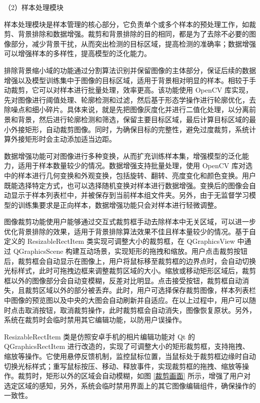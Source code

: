 \documentclass[
  ]{njuthesis}
\begin{document}
（2）样本处理模块

样本处理模块是样本管理的核心部分，它负责单个或多个样本的预处理工作，如裁剪、背景排除和数据增强。裁剪和背景排除的目的相同，都是为了去除不必要的图像部分，减少背景干扰，从而突出检测的目标区域，提高检测的准确率；数据增强可以增强样本的多样性，提高模型的泛化能力。

排除背景缩小域的功能通过分割算法识别并保留图像的主体部分，保证后续的数据增强以及模型训练集中于图像的目标区域，适用于背景相对明显的样本。相较于手动裁剪，它可以对样本进行批量处理，效率更高。该功能使用 OpenCV 库实现，先对图像进行阈值处理、轮廓检测和过滤，然后基于形态学操作进行轮廓优化，去除噪点和细小碎片。具体来说，就是先把图像灰度化并进行二值化处理，以分离前景和背景，然后进行轮廓检测和筛选，保留主要目标区域，最后计算目标区域的最小外接矩形，自动裁剪图像。同时，为确保目标的完整性，避免过度裁剪，系统计算外接矩形时会主动添加适当边距。

数据增强功能可对图像进行多种变换，从而扩充训练样本集，增强模型的泛化能力，适用于样本数量较少的情况。数据增强支持批量处理，使用 OpenCV 库对选中的样本进行几何变换和外观变换，包括旋转、翻转、亮度变化和颜色变换。用户既能选择特定方式，也可以选择随机变换对样本进行数据增强。变换后的图像会自动显示于样本列表栏中，并被保存到当前样本组文件夹。另外，由于无监督学习模型的训练集要求是正向样本，数据增强功能只会对样本进行轻微调整。

图像裁剪功能使用户能够通过交互式裁剪框手动去除样本中无关区域，可以进一步优化背景排除的效果，适用于背景排除算法效果不佳且样本量较少的情况。基于自定义的 ResizableRectItem 类实现可调整大小的裁剪框，在 QGraphicsView 中通过 QGraphicsScene 构建互动场景，实现矩形的拖拽和缩放。用户点击裁剪按钮后，裁剪框会自动显示在图像上，用户将鼠标移至裁剪框的边界点时，会自动切换光标样式，此时可拖拽边框来调整裁剪区域的大小。缩放或移动矩形区域后，裁剪框以外的图像部分会自动变模糊，反差对比明显。点击接受按钮，裁剪框自动消失，且裁剪区域以外的部分被丢弃。此时，用户可选择保存裁剪图像，样本列表栏中图像的预览图以及中央的大图会自动刷新并自适应。在以上过程中，用户可以随时点击取消按钮，取消裁剪操作，此时裁剪框会自动消失，图像恢复原状。另外，系统在裁剪时会临时禁用其它编辑功能，以防用户误操作。

ResizableRectItem 类是仿照安卓手机的相片编辑功能对 Qt 的 QGraphicsRectItem 进行改造的，实现了可调整大小的矩形裁剪框，支持拖拽、缩放等操作。它使用悬停反馈机制，监控鼠标位置，当鼠标处于裁剪框边缘时自动切换光标样式；重写鼠标按压、移动、释放事件，实现裁剪框的拖拽、缩放等操作。裁剪时，矩形以外的区域会自动模糊，如图 \ref{裁剪画面} 所示，增强了用户对选定区域的感知，另外，系统会临时禁用界面上的其它图像编辑组件，确保操作的一致性。
\end{document}
